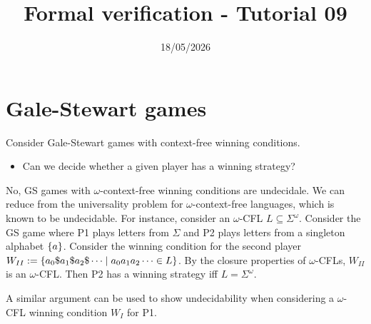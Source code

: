

\title{Formal verification - Tutorial 09}
\date{18/05/2026}



\maketitle

\section*{Gale-Stewart games}

\begin{exercise}
    Consider Gale-Stewart games with context-free winning conditions.
    \begin{itemize}
        \item Can we decide whether a given player has a winning strategy?
    \end{itemize}
\end{exercise}
\begin{solution}
    No, GS games with $\omega$-context-free winning conditions are undecidale.
    We can reduce from the universality problem for $\omega$-context-free languages, which is known to be undecidable.
    For instance, consider an $\omega$-CFL $L \subseteq \Sigma^\omega$.
    Consider the GS game where P1 plays letters from $\Sigma$ and P2 plays letters from a singleton alphabet $\left\{a\right\}$.
    Consider the winning condition for the second player
    $W_{II} := \left\{a_0 \$ a_1 \$ a_2 \$ \cdots \;\middle|\; a_0 a_1 a_2 \cdots \in L\right\}$.
    By the closure properties of $\omega$-CFLs, $W_{II}$ is an $\omega$-CFL.
    Then P2 has a winning strategy iff $L = \Sigma^\omega$.

    A similar argument can be used to show undecidability when considering a $\omega$-CFL winning condition $W_I$ for P1.
\end{solution}



